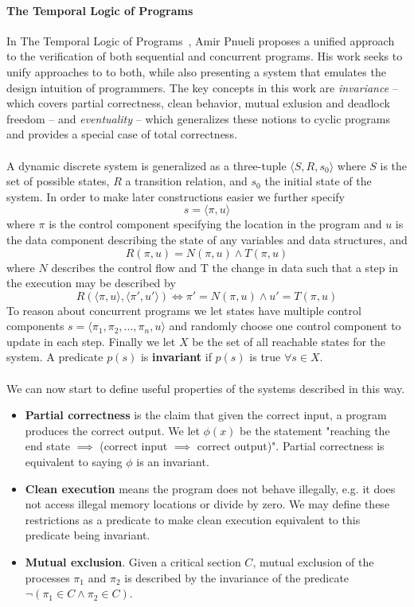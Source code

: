 \documentclass{uit-thesis}
\begin{document}
\paragraph{The Temporal Logic of Programs ~\cite{Pnueli1977}}
In The Temporal Logic of Programs~\cite{Pnueli1977}, Amir Pnueli proposes a unified approach to the verification of both sequential and concurrent programs. His work seeks to unify approaches to to both, while also presenting a system that emulates the design intuition of programmers. The key concepts in this work are \textit{invariance} -- which covers partial correctness, clean behavior, mutual exlusion and deadlock freedom -- and \textit{eventuality} -- which generalizes these notions to cyclic programs and provides a special case of total correctness.
\\\\
A dynamic discrete system is generalized as a three-tuple $\langle S, R, s_0 \rangle$ where $S$ is the set of possible states, $R$ a transition relation, and $s_0$ the initial state of the system. In order to make later constructions easier we further specify
$$s = \langle \pi, u \rangle$$ where $\pi$ is the control component specifying the location in the program and $u$ is the data component describing the state of any variables and data structures, and
$$R(\pi, u) = N(\pi, u) \land T(\pi, u)$$ where $N$ describes the control flow and T the change in data such that a step in the execution may be described by
$$R(\langle \pi, u \rangle , \langle \pi', u' \rangle) \iff \pi' = N(\pi, u) \land u' = T(\pi, u)$$
To reason about concurrent programs we let states have multiple control components $s = \langle \pi_1, \pi_2,...,\pi_n, u \rangle$ and randomly choose one control component to update in each step. Finally we let $X$ be the set of all reachable states for the system. A predicate $p(s)$ is \textbf{invariant} if $p(s)$ is true $\forall s \in X$.
\\\\
We can now start to define useful properties of the systems described in this way.
\begin{itemize}[label={}]
    \item \textbf{Partial correctness} is the claim that given the correct input, a program produces the correct output. We let $\phi(x)$ be the statement "reaching the end state $\implies$ (correct input $\implies$ correct output)". Partial correctness is equivalent to saying $\phi$ is an invariant.
    \item \textbf{Clean execution} means the program does not behave illegally, e.g. it does not access illegal memory locations or divide by zero. We may define these restrictions as a predicate to make clean execution equivalent to this predicate being invariant.
    \item \textbf{Mutual exclusion}. Given a critical section $C$, mutual exclusion of the processes $\pi_1$ and $\pi_2$ is described by the invariance of the predicate $\lnot(\pi_1 \in C \land \pi_2 \in C)$.
\end{itemize}
\end{document}
